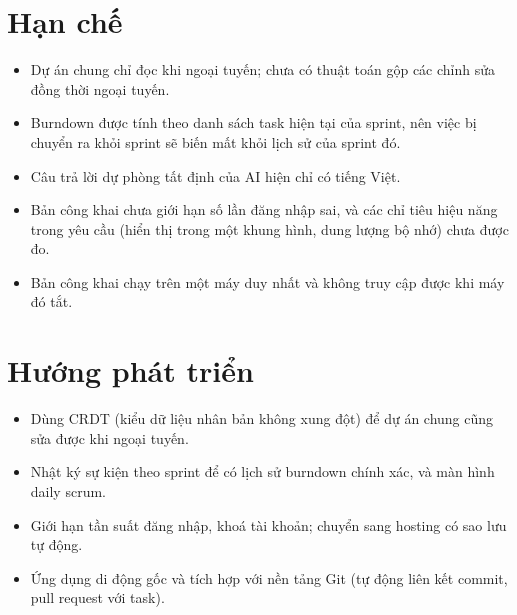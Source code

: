 \documentclass[../main.tex]{subfiles}
\begin{document}
\section*{Hạn chế}
\begin{itemize}
  \item Dự án chung chỉ đọc khi ngoại tuyến; chưa có thuật toán gộp các chỉnh sửa đồng thời ngoại
        tuyến.
  \item Burndown được tính theo danh sách task hiện tại của sprint, nên việc bị chuyển ra khỏi sprint
        sẽ biến mất khỏi lịch sử của sprint đó.
  \item Câu trả lời dự phòng tất định của AI hiện chỉ có tiếng Việt.
  \item Bản công khai chưa giới hạn số lần đăng nhập sai, và các chỉ tiêu hiệu năng trong yêu cầu
        (hiển thị trong một khung hình, dung lượng bộ nhớ) chưa được đo.
  \item Bản công khai chạy trên một máy duy nhất và không truy cập được khi máy đó tắt.
\end{itemize}

\section*{Hướng phát triển}
\begin{itemize}
  \item Dùng CRDT (kiểu dữ liệu nhân bản không xung đột) để dự án chung cũng sửa được khi ngoại tuyến.
  \item Nhật ký sự kiện theo sprint để có lịch sử burndown chính xác, và màn hình daily scrum.
  \item Giới hạn tần suất đăng nhập, khoá tài khoản; chuyển sang hosting có sao lưu tự động.
  \item Ứng dụng di động gốc và tích hợp với nền tảng Git (tự động liên kết commit, pull request với
        task).
\end{itemize}
\end{document}
